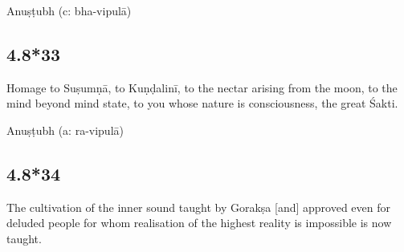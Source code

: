 \begin{ekdosis}


\begin{metre}[hp04_008_32]
Anuṣṭubh (c: bha-vipulā)
\end{metre}

\subsection*{4.8*33}
\begin{translation}[hp04_008_33]
Homage to Suṣumṇā, to Kuṇḍalinī, to the nectar arising from the moon, to the mind beyond mind state, to you whose nature is consciousness, the great Śakti.%
\end{translation}




\begin{metre}[hp04_008_33]
Anuṣṭubh (a: ra-vipulā)
\end{metre}

\subsection*{4.8*34}
\begin{translation}[hp04_008_34]
The cultivation of the inner sound taught by Gorakṣa [and] approved even for deluded people for whom realisation of the highest reality is impossible is now taught.
\end{translation}




\end{ekdosis}
